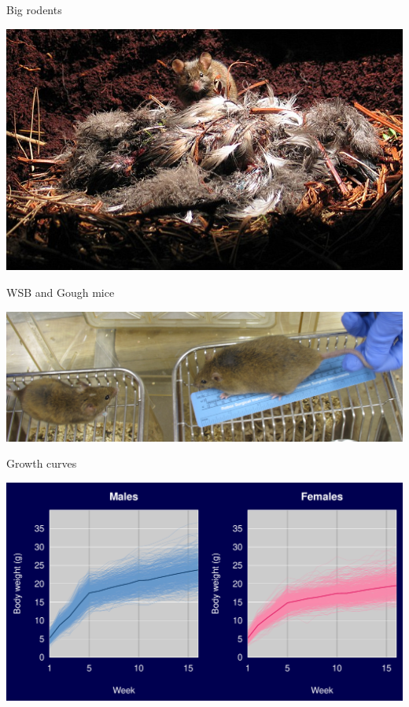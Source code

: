 \documentclass[12pt]{article}
\newcommand{\headsize}{\fontsize{35}{35} \selectfont}
\begin{document}
\addtocounter{page}{-1}

\headsize \color{myyellow}
\hfill \begin{minipage}{5.75in}
\centering
Big rodents
\end{minipage}

\vspace{10mm}

\centerline{\includegraphics[width=\textwidth]{Figs/gough_mouse_with_bird.jpg}}


\newpage

\headsize \color{myyellow}
\hfill \begin{minipage}{5.75in}
\centering
WSB and Gough mice
\end{minipage}

\vspace{30mm}

\centerline{\includegraphics[width=\textwidth]{Figs/wsb_508_and_gough_535_cropped.jpg}}


\newpage

\headsize \color{myyellow}
\hfill \begin{minipage}{5.75in}
\centering
Growth curves
\end{minipage}

\vspace{30mm}

\centerline{\includegraphics{Figs/growth1.pdf}}
\end{document}
